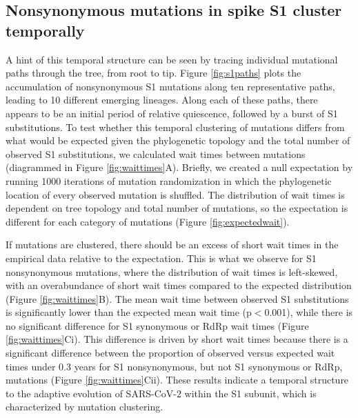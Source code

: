 \documentclass[11pt,oneside,letterpaper]{article}
\begin{document}
\subsection*{Nonsynonymous mutations in spike S1 cluster temporally}
A hint of this temporal structure can be seen by tracing individual mutational paths through the tree, from root to tip. 
Figure \ref{fig:s1paths} plots the accumulation of nonsynonymous S1 mutations along ten representative paths, leading to 10 different emerging lineages. 
Along each of these paths, there appears to be an initial period of relative quiescence, followed by a burst of S1 substitutions. 
To test whether this temporal clustering of mutations differs from what would be expected given the phylogenetic topology and the total number of observed S1 substitutions, we calculated wait times between mutations (diagrammed in Figure \ref{fig:waittimes}A). 
Briefly, we created a null expectation by running 1000 iterations of mutation randomization in which the phylogenetic location of every observed mutation is shuffled. 
The distribution of wait times is dependent on tree topology and total number of mutations, so the expectation is different for each category of mutations (Figure \ref{fig:expectedwait}).

If mutations are clustered, there should be an excess of short wait times in the empirical data relative to the expectation. 
This is what we observe for S1 nonsynonymous mutations, where the distribution of wait times is left-skewed, with an overabundance of short wait times compared to the expected distribution (Figure \ref{fig:waittimes}B). 
The mean wait time between observed S1 substitutions is significantly lower than the expected mean wait time (p$<$0.001), while there is no significant difference for S1 synonymous or RdRp wait times (Figure \ref{fig:waittimes}Ci). 
This difference is driven by short wait times because there is a significant difference between the proportion of observed versus expected wait times under 0.3 years for S1 nonsynonymous, but not S1 synonymous or RdRp, mutations (Figure \ref{fig:waittimes}Cii). 
These results indicate a temporal structure to the adaptive evolution of SARS-CoV-2 within the S1 subunit, which is characterized by mutation clustering.
\end{document}
